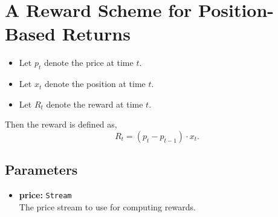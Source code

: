 \documentclass{article}
\begin{document}
\section*{A Reward Scheme for Position-Based Returns}

\begin{itemize}
    \item Let \(p_t\) denote the price at time \(t\).
    \item Let \(x_t\) denote the position at time \(t\).
    \item Let \(R_t\) denote the reward at time \(t\).
\end{itemize}

Then the reward is defined as,
\[
R_t = (p_t - p_{t-1}) \cdot x_t.
\]

\subsection*{Parameters}
\begin{itemize}
    \item \textbf{price:} \texttt{Stream} \\
        The price stream to use for computing rewards.
\end{itemize}
\end{document}
